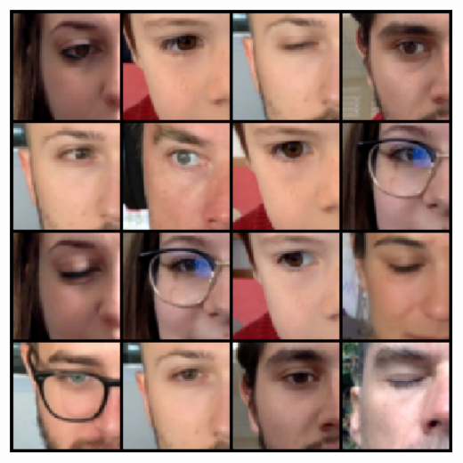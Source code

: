 \documentclass[a0,portrait]{a0poster}
\begin{document}
\vspace{4cm} 

\begin{multicols}{3} %


\color{Navy} %

\begin{abstract}
Recording eye movements is a technique that attracts an increasing number of scientists, but also in the general public. Indeed, this allows to quantitatively measure a number of useful dimensions of perception and behavior in general. However, most existing trackers rely on expensive or technically complex solutions. Here, we propose a simple framework to record eye movements using any camera, such as a webcam. As a proof of concept, the recorded image is processed in real-time to detect from a simple sub-set of eye movements : left, center, right or blink. The processing is based on two stages. First, we use a pre-trained computer vision algorithm to extract the image of the face. Second, we used a classical deep-learning architecture to learn to classify these sub-images. This network is a 3 layered convolutional neural network, for which we optimized performance as measured by the accuracy with cross-validation on a wide range of the network's hyper-parameters. Over a dataset of more than 1000 images, this network achieves an average accuracy of approximately 97\%. We also provide with an integration with the psychopy library which shows that frames can be processed on a standard laptop at a rate of approximately 25Hz.
\end{abstract}
\includegraphics[width=1.\linewidth, height=.2\linewidth]{dataset.pdf}

\color{Black} %

\end{multicols}
\end{document}
